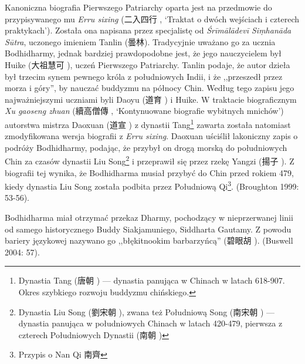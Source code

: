 Kanoniczna biografia Pierwszego Patriarchy oparta jest na przedmowie do przypisywanego mu \textit{Erru sixing} (二入四行 , `Traktat o dwóch wejściach i czterech praktykach').
Została ona napisana przez specjalistę od \textit{Śrīmālādevī Si\d{m}hanāda Sūtra}, uczonego imieniem Tanlin (曇林).
Tradycyjnie uważano go za ucznia Bodhidharmy, jednak bardziej prawdopodobne jest, że jego nauczycielem był Huike (大祖慧可 ), uczeń Pierwszego Patriarchy.
Tanlin podaje, że autor dzieła był trzecim synem pewnego króla z południowych Indii, i że ,,przeszedł przez morza i góry'', by nauczać buddyzmu na północy Chin.
Według tego zapisu jego najważniejszymi uczniami byli Daoyu (道育 ) i Huike.
W traktacie biograficznym \textit{Xu gaoseng zhuan} (續高僧傳 , `Kontynuowane biografie wybitnych mnichów') autorstwa mistrza Daoxuan (道宣 ) z dynastii Tang\footnote{Dynastia Tang (唐朝 ) --- dynastia panująca w Chinach w latach 618-907. Okres szybkiego rozwoju buddyzmu chińskiego.} zawarta została natomiast zmodyfikowana wersja biografii z \textit{Erru sixing}.
Daoxuan uściślił lakoniczny zapis o podróży Bodhidharmy, podając, że przybył on drogą morską do południowych Chin za czasów dynastii Liu Song\footnote{Dynastia Liu Song (劉宋朝 ), zwana też Południową Song (南宋朝 ) --- dynastia panująca w południowych Chinach w latach 420-479, pierwsza z czterech Południowych Dynastii (南朝 )} i przeprawił się przez rzekę Yangzi (揚子 ).
Z biografii tej wynika, że Bodhidharma musiał przybyć do Chin przed rokiem 479, kiedy dynastia Liu Song została podbita przez Południową Qi\footnote{Przypis o Nan Qi 南齊}.
(Broughton 1999: 53-56).

Bodhidharma miał otrzymać przekaz Dharmy, pochodzący w nieprzerwanej linii od samego historycznego Buddy Siakjamuniego, Siddharta Gautamy. Z powodu bariery językowej nazywano go ,,błękitnookim barbarzyńcą'' (碧眼胡 ).
(Buswell 2004: 57).
%

